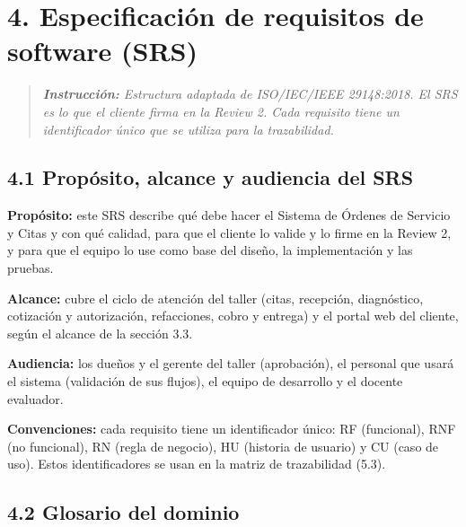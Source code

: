 \section{4. Especificación de requisitos de software
(SRS)}\label{especificaciuxf3n-de-requisitos-de-software-srs}

\begin{quote}
\emph{\textbf{Instrucción:} Estructura adaptada de ISO/IEC/IEEE
29148:2018. El SRS es lo que el cliente firma en la Review 2. Cada
requisito tiene un identificador único que se utiliza para la
trazabilidad.}
\end{quote}

\subsection{4.1 Propósito, alcance y audiencia del
SRS}\label{propuxf3sito-alcance-y-audiencia-del-srs}

\textbf{Propósito:} este SRS describe qué debe hacer el Sistema de
Órdenes de Servicio y Citas y con qué calidad, para que el cliente lo
valide y lo firme en la Review 2, y para que el equipo lo use como base
del diseño, la implementación y las pruebas.

\textbf{Alcance:} cubre el ciclo de atención del taller (citas,
recepción, diagnóstico, cotización y autorización, refacciones, cobro y
entrega) y el portal web del cliente, según el alcance de la sección
3.3.

\textbf{Audiencia:} los dueños y el gerente del taller (aprobación), el
personal que usará el sistema (validación de sus flujos), el equipo de
desarrollo y el docente evaluador.

\textbf{Convenciones:} cada requisito tiene un identificador único: RF
(funcional), RNF (no funcional), RN (regla de negocio), HU (historia de
usuario) y CU (caso de uso). Estos identificadores se usan en la matriz
de trazabilidad (5.3).

\subsection{4.2 Glosario del dominio}\label{glosario-del-dominio}

